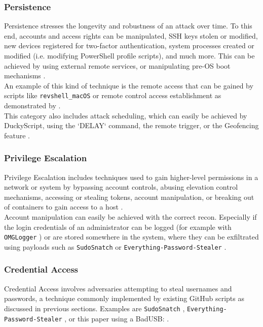 \subsubsection{Persistence} \label{persistence}

Persistence stresses the longevity and robustness of an attack over time. To this end, accounts and access rights can be manipulated, SSH keys stolen or modified, new devices registered for two-factor authentication, system processes created or modified  (i.e. modifying PowerShell profile scripts), and much more. This can be achieved by using external remote services, or manipulating pre-OS boot mechanisms \cite{MITREATTCK}. \\
An example of this kind of technique is the remote access that can be gained by scripts like \verb|revshell_macOS| \cite{OmgpayloadsPayloadsLibrary}
or remote control access establishment as demonstrated by \cite{bojovicRisingThreatHardware2019}. \\
This category also includes attack scheduling, which can easily be achieved by DuckyScript, using the `DELAY` command, the remote trigger, or the Geofencing feature \cite{hak5MGCable}.

\subsubsection{Privilege Escalation}

Privilege Escalation includes techniques used to gain higher-level permissions in a network or system by bypassing account controls, abusing elevation control mechanisms, accessing or stealing tokens, account manipulation, or breaking out of containers to gain access to a host \cite{MITREATTCK}. \\
Account manipulation can easily be achieved with the correct recon. Especially if the login credentials of an administrator can be logged (for example with \verb|OMGLogger| \cite{OmgpayloadsPayloadsLibrary}) or are stored somewhere in the system, where they can be exfiltrated using payloads such as \verb|SudoSnatch| \cite{OmgpayloadsPayloadsLibrary} or \verb|Everything-Password-Stealer| \cite{OmgpayloadsPayloadsLibrary}.

\subsubsection{Credential Access}

Credential Access involves adversaries attempting to steal usernames and passwords, a technique commonly implemented by existing GitHub scripts as discussed in previous sections.
Examples are \verb|SudoSnatch| \cite{OmgpayloadsPayloadsLibrary}, \verb|Everything-Password-Stealer| \cite{OmgpayloadsPayloadsLibrary}, or this paper using a BadUSB:  \cite{muslimImplementationAnalysisUSB2020}.


